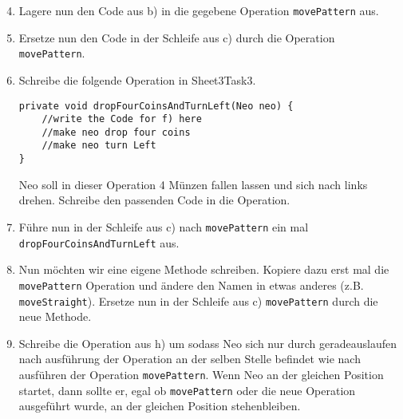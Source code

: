 \begin{enumerate}\setcounter{enumi}{3}
	\item 
		Lagere nun den Code aus b) in die gegebene Operation \lstinline{movePattern} aus.

	\item
		Ersetze nun den Code in der Schleife aus c) durch die Operation \lstinline{movePattern}.

	\item
		Schreibe die folgende Operation in Sheet3Task3.

		\begin{lstlisting}
private void dropFourCoinsAndTurnLeft(Neo neo) {
    //write the Code for f) here
    //make neo drop four coins
    //make neo turn Left
}
		\end{lstlisting}

		Neo soll in dieser Operation 4 Münzen fallen lassen und sich nach links drehen. 
		Schreibe den passenden Code in die Operation.

	\item
		Führe nun in der Schleife aus c) nach \lstinline{movePattern} ein mal \lstinline{dropFourCoinsAndTurnLeft} aus.

	\item
		Nun möchten wir eine eigene Methode schreiben. 
		Kopiere dazu erst mal die \lstinline{movePattern} Operation und ändere den Namen in etwas anderes (z.B. \lstinline{moveStraight}).
		Ersetze nun in der Schleife aus c) \lstinline{movePattern} durch die neue Methode.

	\item
		Schreibe die Operation aus h) um sodass Neo sich nur durch geradeauslaufen nach ausführung der Operation an der selben Stelle befindet wie nach ausführen der Operation \lstinline{movePattern}.
		Wenn Neo an der gleichen Position startet, dann sollte er, egal ob \lstinline{movePattern} oder die neue Operation ausgeführt wurde, an der gleichen Position stehenbleiben.
\end{enumerate}
\newpage
